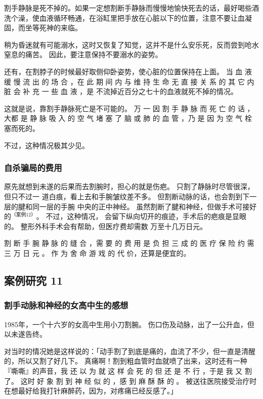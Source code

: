 \documentclass[UTF8]{ctexart}
\begin{document}
割手静脉是死不掉的。如果一定想割断手静脉而慢慢地愉快死去的话，最好喝些酒洗个澡，使血液循环畅通，在浴缸里把手放在心脏以下的位置，注意不要让血凝固，而坐等死神的来临。

稍为昏迷就有可能溺水，这时又恢复了知觉，这并不是什么安乐死，反而尝到呛水窒息的痛苦。
因此，要注意保持不要溺水的姿势。

还有，在割脖子的时候最好取侧仰卧姿势，使心脏的位置保持在上面。
当 血 液 缓 慢 流 出 的 场 合 ，在 此 期 间 内 与 维 持 生 命 无 直 接 关 系 的 其 它 内 脏 会 补 充 一 些 血 液 ，是 不流掉近百分之七十的血液就死不掉的情况。

这就是说，靠割手静脉死亡是不可能的。 
万 一 因 割 手 静 脉 而 死 亡 的 话 ，大都 是 静 脉 吸 入 的 空 气 堵 塞 了 脑 或 肺 的 血 管 ，乃 是 因 为 空 气 栓 塞而死的。

不过，这种情况极其少见。 

\subsubsection*{自杀骗局的费用}

原先就想到未遂的后果而去割腕时，担心的就是伤疤。
只割了静脉时尽管很深，但只不过一 道白痕，看上去和手腕皱纹差不多。
但割断动脉的话，也会割到下一层的腱和同一层的手腕 中央的正中神经。
虽然割断了腱和神经，但做手术可接好的$^{（案例 12）}$。
不过，这种情况， 会留下纵向切开的痕迹，手术后的疤痕是显眼的。
整形外科手术会有帮助，但医疗费却需数 万至十几万日元。

割 断 手 腕 静 脉 的 缝 合 ，需 要 的 费 用 是 负 担 三 成 的 医 疗 保 险 约 需 三 万 日 元 。
作 为 舍 命 游 戏 的 代 价，还算是便宜的。

\subsection{案例研究 11}
\subsubsection*{割手动脉和神经的女高中生的感想}

1985年，一个十六岁的女高中生用小刀割腕。
伤口伤及动脉，出了一公升血，但以未遂告终。

对当时的情况她是这样说的：「动手割了到底是痛的，血流了不少，但一直是清醒的，所以又割了好几下。
真痛啊！割到粗血管时血就喷了出来，这时还有一种『嘶嘶』的声音，我 还 以 为 就 这 样 会 死 的 但 还 是 不 行 ，于是 我 又 割 了。
这时 好 象 割 到 神 经 似 的 ，感 到 麻 酥 酥 的 。 
被送往医院接受治疗时在想最好给我打针麻醉药，因为，对疼痛已经反感了。」
\end{document}
